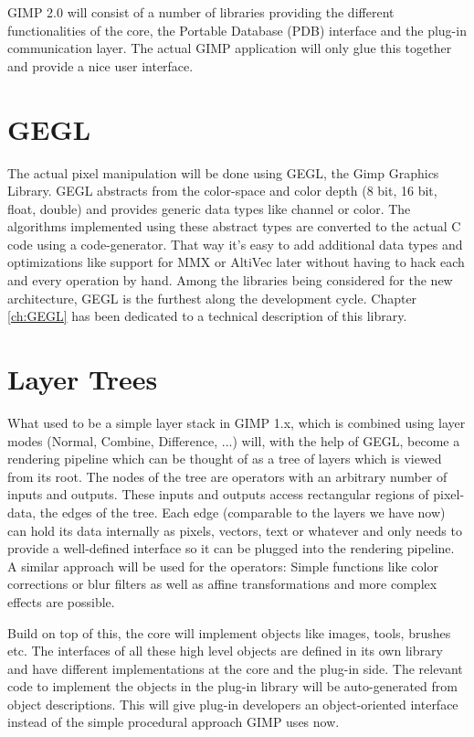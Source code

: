 GIMP 2.0 will consist of a number of libraries providing the different
functionalities of the core, the Portable Database (PDB) interface and
the plug-in communication layer. The actual GIMP application will only
glue this together and provide a nice user interface.

\section{GEGL}

The actual pixel manipulation will be done using GEGL, the Gimp
Graphics Library. GEGL abstracts from the color-space and color depth
(8 bit, 16 bit, float, double) and provides generic data types like
channel or color. The algorithms implemented using these abstract
types are converted to the actual C code using a code-generator. That
way it's easy to add additional data types and optimizations like
support for MMX or AltiVec later without having to hack each and every
operation by hand. Among the libraries being considered for the new
architecture, GEGL is the furthest along the development cycle.
Chapter \ref{ch:GEGL} has been dedicated to a technical description
of this library.

\section{Layer Trees}
 
What used to be a simple layer stack in GIMP 1.x, which is combined
using layer modes (Normal, Combine, Difference, ...) will, with the
help of GEGL, become a rendering pipeline which can be thought of as a
tree of layers which is viewed from its root. The nodes of the tree
are operators with an arbitrary number of inputs and outputs. These
inputs and outputs access rectangular regions of pixel-data, the edges
of the tree. Each edge (comparable to the layers we have now) can hold
its data internally as pixels, vectors, text or whatever and only
needs to provide a well-defined interface so it can be plugged into
the rendering pipeline. A similar approach will be used for the
operators: Simple functions like color corrections or blur filters as
well as affine transformations and more complex effects are possible.


Build on top of this, the core will implement objects like images,
tools, brushes etc. The interfaces of all these high level objects are
defined in its own library and have different implementations at the
core and the plug-in side. The relevant code to implement the objects
in the plug-in library will be auto-generated from object
descriptions. This will give plug-in developers an object-oriented
interface instead of the simple procedural approach GIMP uses now.


